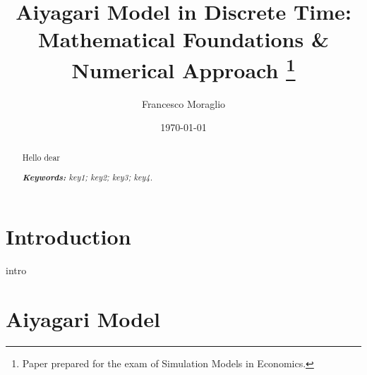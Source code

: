 \documentclass[12pt]{article}
\title{Aiyagari Model in Discrete Time: Mathematical Foundations \& Numerical Approach
\thanks{Paper prepared for the exam of Simulation Models in Economics.}
}
\author{Francesco Moraglio}
\date{\today}
\begin{document}
\maketitle

\begin{abstract}
Hello dear 

\noindent
\textit{\textbf{Keywords: }%
key1; key2; key3; key4.} \\ %

\end{abstract}

\section{Introduction}
intro
\section{Aiyagari Model}
\end{document}
